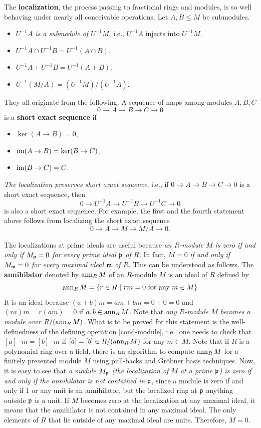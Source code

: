 The {\bf localization}, the process passing to fractional rings and modules,
is so well behaving under nearly all conceivable operations.
Let $A, B \le M$ be submodules.
\begin{itemize}
\item {\em $U^{-1}A$ is a submodule of $U^{-1}M$}, i.e., $U^{-1}A$ injects into $U^{-1}M$.
\item {\em $U^{-1}A \cap U^{-1}B = U^{-1}(A \cap B)$}.
\item {\em $U^{-1}A + U^{-1}B = U^{-1}(A + B)$}.
\item {\em $U^{-1}(M/A) = (U^{-1}M)/(U^{-1}A)$}.
\end{itemize}
They all originate from the following.
A sequence of maps among modules $A,B,C$
\[
 0 \to A \to B \to C \to 0
\]
is a {\bf short exact sequence} if
\begin{itemize}
 \item $\ker( A \to B ) = 0$,
 \item $\mathop{\mathrm{im}}\nolimits( A \to B ) = \ker ( B \to C)$,
 \item $\mathop{\mathrm{im}}\nolimits(B \to C ) = C$.
\end{itemize}
{\em The localization preserves short exact sequence}, i.e., if $0 \to A \to B \to C \to 0$ is a short exact sequence, then
\[
 0 \to U^{-1}A \to U^{-1}B \to U^{-1}C \to 0
\]
is also a short exact sequence. For example, the first and the fourth statement above follows from localizing the short exact sequence
\[
 0 \to A \to M \to M/A \to 0.
\]




The localizations at prime ideals are useful because {\em an $R$-module $M$ is zero if and only if
$M_{\mathfrak{p}} = 0$ for every prime ideal $\mathfrak{p}$ of $R$.}
In fact, $M = 0$ {\em if and only if $M_{\mathfrak{m}} = 0$ for every maximal ideal $\mathfrak{m}$ of $R$.}
This can be understood as follows.
The {\bf annihilator} denoted by $\mathop{\mathrm{ann}}\nolimits_R M$ of an $R$-module $M$ is an ideal of $R$ defined by
\begin{equation}
 \mathop{\mathrm{ann}}\nolimits_R M = \{ r \in R ~|~ r m = 0 \text{ for any } m \in M \}
\end{equation}
It is an ideal because $(a+b)m = am + bm = 0 + 0 = 0$ and $(ra)m = r(am) = 0$ if $a, b \in \mathop{\mathrm{ann}}\nolimits_R M$.
Note that {\em any $R$-module $M$ becomes a module over $R/(\mathop{\mathrm{ann}}\nolimits_R M)$. }
What is to be proved for this statement is the well-definedness of the defining operation \eqref{cond-module},
i.e., one needs to check that $[a]\cdot m = [b]\cdot m$ if $[a]=[b] \in R/(\mathop{\mathrm{ann}}\nolimits_R M)$ for any $m \in M$.
Note that if $R$ is a polynomial ring over a field, there is an algorithm to compute $\mathop{\mathrm{ann}}\nolimits_R M$
for a finitely presented module $M$ using pull-backs and Gr\"obner basis techniques.
Now, it is easy to see that 
{\em a module $M_{\mathfrak{p}}$ (the localization of $M$ at a prime $\mathfrak{p}$)
is zero if and only if the annihilator is not contained in $\mathfrak{p}$},
since a module is zero if and only if $1$ or any unit is an annihilator,
but the localized ring at $\mathfrak{p}$ anything outside $\mathfrak{p}$ is a unit.
If $M$ becomes zero at the localization at any maximal ideal,
it means that the annihilator is not contained in any maximal ideal.
The only elements of $R$ that lie outside of any maximal ideal are units.
Therefore, $M = 0$.


